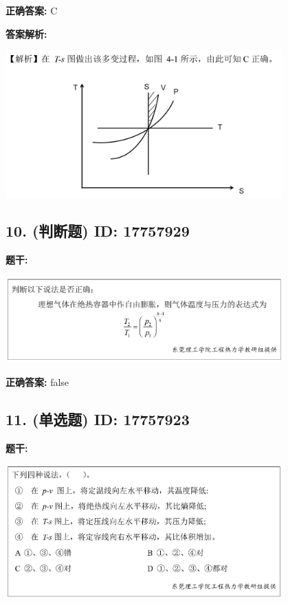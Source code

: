 \documentclass[12pt]{article}
\begin{document}
\textbf{正确答案:}
C

\textbf{答案解析:}


\begin{center}\includegraphics[width=0.8\textwidth, height=0.25\textheight, keepaspectratio]{question_9_17757927/correct_replay_img_1.png}\end{center}

\vspace{0.5em}\hrulefill\vspace{1em}

\subsection*{10. (判断题) \small ID: 17757929}

\textbf{题干:}


\begin{center}\includegraphics[width=0.8\textwidth, height=0.25\textheight, keepaspectratio]{question_10_17757929/title_img_1.png}\end{center}

\textbf{正确答案:}
false

\vspace{0.5em}\hrulefill\vspace{1em}

\subsection*{11. (单选题) \small ID: 17757923}

\textbf{题干:}


\begin{center}\includegraphics[width=0.8\textwidth, height=0.25\textheight, keepaspectratio]{question_11_17757923/title_img_1.png}\end{center}
\end{document}
